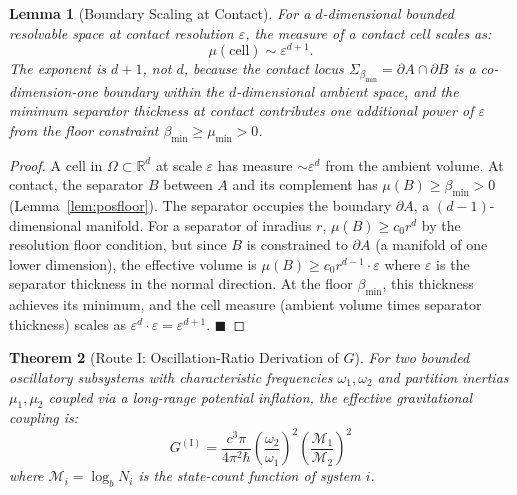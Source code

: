 \documentclass[11pt,twocolumn,a4paper]{article}
\theoremstyle{plain}
\newtheorem{theorem}{Theorem}[section]
\newtheorem{lemma}[theorem]{Lemma}
\theoremstyle{definition}
\theoremstyle{remark}
\newcommand{\bmin}{\beta_{\min}}
\renewcommand{\qed}{\hfill$\blacksquare$}
\begin{document}
\begin{lemma}[Boundary Scaling at Contact]
\label{lem:boundary_scaling}
For a $d$-dimensional bounded resolvable space at contact resolution $\varepsilon$,
the measure of a contact cell scales as:
\[
  \mu(\text{cell}) \sim \varepsilon^{d+1}.
\]
The exponent is $d + 1$, not $d$, because the contact locus
$\Sigma_{\bmin} = \partial A \cap \partial B$ is a co-dimension-one boundary
within the $d$-dimensional ambient space, and the minimum separator thickness
at contact contributes one additional power of $\varepsilon$ from the floor
constraint $\bmin \geq \mu_{\min} > 0$.
\end{lemma}

\begin{proof}
A cell in $\Omega \subset \mathbb{R}^d$ at scale $\varepsilon$ has measure
$\sim\varepsilon^d$ from the ambient volume. At contact, the separator $B$
between $A$ and its complement has $\mu(B) \geq \bmin > 0$ (Lemma~\ref{lem:posfloor}).
The separator occupies the boundary $\partial A$, a $(d-1)$-dimensional manifold.
For a separator of inradius $r$, $\mu(B) \geq c_0 r^d$ by the resolution floor
condition, but since $B$ is constrained to $\partial A$ (a manifold of one lower
dimension), the effective volume is $\mu(B) \geq c_0 r^{d-1}\cdot\varepsilon$
where $\varepsilon$ is the separator thickness in the normal direction. At the
floor $\bmin$, this thickness achieves its minimum, and the cell measure (ambient
volume times separator thickness) scales as $\varepsilon^d \cdot \varepsilon =
\varepsilon^{d+1}$. \qed
\end{proof}

\begin{theorem}[Route I: Oscillation-Ratio Derivation of $G$]
\label{thm:routeI}
For two bounded oscillatory subsystems with characteristic frequencies
$\omega_1, \omega_2$ and partition inertias $\mu_1, \mu_2$ coupled via a
long-range potential inflation, the effective gravitational coupling is:
\[
  G^{(\mathrm{I})} = \frac{c^3\pi}{4\pi^2\hbar}
  \left(\frac{\omega_2}{\omega_1}\right)^2
  \left(\frac{\mathcal{M}_1}{\mathcal{M}_2}\right)^2
\]
where $\mathcal{M}_i = \log_b N_i$ is the state-count function of system $i$.
\end{theorem}
\end{document}
